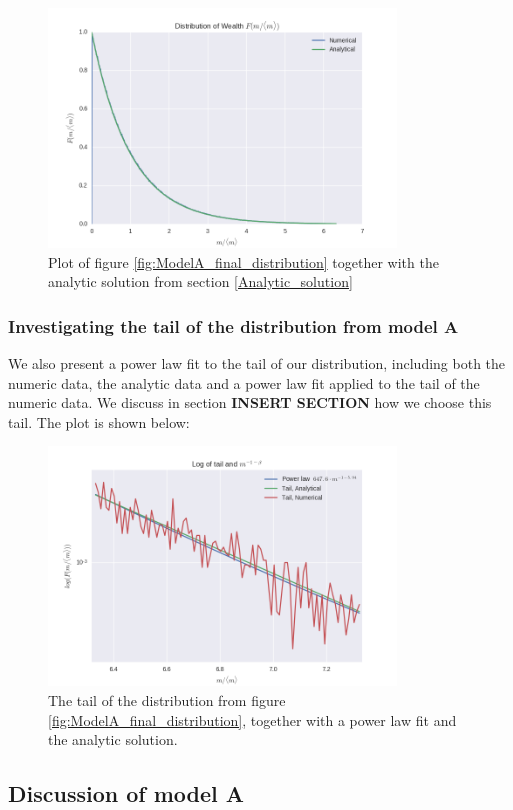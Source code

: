 \documentclass[a4paper, 10pt]{article}
\begin{document}
\begin{figure}[!ht]
\centering
\includegraphics[height=2.5in]{distLamb0WAnalyt.png} %
\caption{Plot of figure \ref{fig:ModelA_final_distribution} together with the analytic solution from section \ref{Analytic_solution}}\label{fig:ModelA_final_distribution_with_analytic}
\end{figure}
\subsubsection{Investigating the tail of the distribution from model A}
We also present a power law fit to the tail of our distribution, including both the numeric data, the analytic data and a power law fit applied to the tail of the numeric data. We discuss in section \textbf{INSERT SECTION} how we choose this tail. The plot is shown below:
\begin{figure}[!ht]
\centering
\includegraphics[height=2.5in]{tailPowerlamb0.png} %
\caption{The tail of the distribution from figure \ref{fig:ModelA_final_distribution}, together with a power law fit and the analytic solution.}\label{fig:ModelA_tail}
\end{figure}
\subsection{Discussion of model A}
\end{document}
